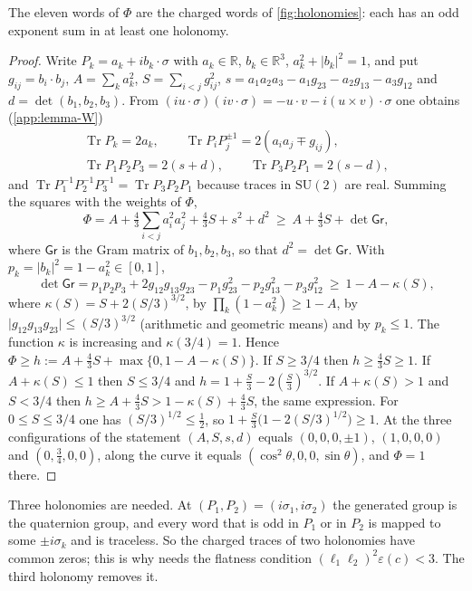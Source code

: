 \documentclass[11pt,a4paper]{amsart}
\theoremstyle{definition}
\theoremstyle{remark}
\numberwithin{equation}{section}
\DeclareMathOperator{\Tr}{Tr}        %
\newcommand{\R}{\mathbb{R}}          %
\newcommand{\abs}[1]{\lvert #1\rvert}      %
\newcommand{\SU}{\mathrm{SU}}              %
\begin{document}
The eleven words of $\Phi$ are the charged words of \cref{fig:holonomies}: each has an odd exponent sum in at least one holonomy.

\begin{proof}
Write $P_k=a_k+ib_k\cdot\sigma$ with $a_k\in\R$, $b_k\in\R^3$, $a_k^2+\abs{b_k}^2=1$, and put $g_{ij}=b_i\cdot b_j$, $A=\sum_ka_k^2$, $S=\sum_{i<j}g_{ij}^2$, $s=a_1a_2a_3-a_1g_{23}-a_2g_{13}-a_3g_{12}$ and $d=\det(b_1,b_2,b_3)$. From $(iu\cdot\sigma)(iv\cdot\sigma)=-u\cdot v-i(u\times v)\cdot\sigma$ one obtains (\cref{app:lemma-W})
\begin{gather*}
\Tr P_k=2a_k,\qquad\Tr P_iP_j^{\pm1}=2(a_ia_j\mp g_{ij}),\\
\Tr P_1P_2P_3=2(s+d),\qquad\Tr P_3P_2P_1=2(s-d),
\end{gather*}
and $\Tr P_1^{-1}P_2^{-1}P_3^{-1}=\Tr P_3P_2P_1$ because traces in $\SU(2)$ are real. Summing the squares with the weights of $\Phi$,
\[
\Phi=A+\tfrac43\sum_{i<j}a_i^2a_j^2+\tfrac43S+s^2+d^2\ \ge\ A+\tfrac43S+\det\mathsf{Gr},
\]
where $\mathsf{Gr}$ is the Gram matrix of $b_1,b_2,b_3$, so that $d^2=\det\mathsf{Gr}$. With $p_k=\abs{b_k}^2=1-a_k^2\in[0,1]$,
\[
\det\mathsf{Gr}=p_1p_2p_3+2g_{12}g_{13}g_{23}-p_1g_{23}^2-p_2g_{13}^2-p_3g_{12}^2\ \ge\ 1-A-\kappa(S),
\]
where $\kappa(S)=S+2(S/3)^{3/2}$, by $\prod_k(1-a_k^2)\ge1-A$, by $\abs{g_{12}g_{13}g_{23}}\le(S/3)^{3/2}$ (arithmetic and geometric means) and by $p_k\le1$. The function $\kappa$ is increasing and $\kappa(3/4)=1$. Hence $\Phi\ge h:=A+\frac43S+\max\{0,1-A-\kappa(S)\}$. If $S\ge3/4$ then $h\ge\frac43S\ge1$. If $A+\kappa(S)\le1$ then $S\le3/4$ and $h=1+\frac S3-2(\frac S3)^{3/2}$. If $A+\kappa(S)>1$ and $S<3/4$ then $h\ge A+\frac43S>1-\kappa(S)+\frac43S$, the same expression. For $0\le S\le3/4$ one has $(S/3)^{1/2}\le\frac12$, so $1+\frac S3\bigl(1-2(S/3)^{1/2}\bigr)\ge1$. At the three configurations of the statement $(A,S,s,d)$ equals $(0,0,0,\pm1)$, $(1,0,0,0)$ and $(0,\frac34,0,0)$, along the curve it equals $(\cos^2\theta,0,0,\sin\theta)$, and $\Phi=1$ there.
\end{proof}

Three holonomies are needed. At $(P_1,P_2)=(i\sigma_1,i\sigma_2)$ the generated group is the quaternion group, and every word that is odd in $P_1$ or in $P_2$ is mapped to some $\pm i\sigma_k$ and is traceless. So the charged traces of two holonomies have common zeros; this is why \cite[Theorem~8]{bhattacharjee2026first} needs the flatness condition $(\ell_1\ell_2)^2\varepsilon(c)<3$. The third holonomy removes it.
\end{document}
